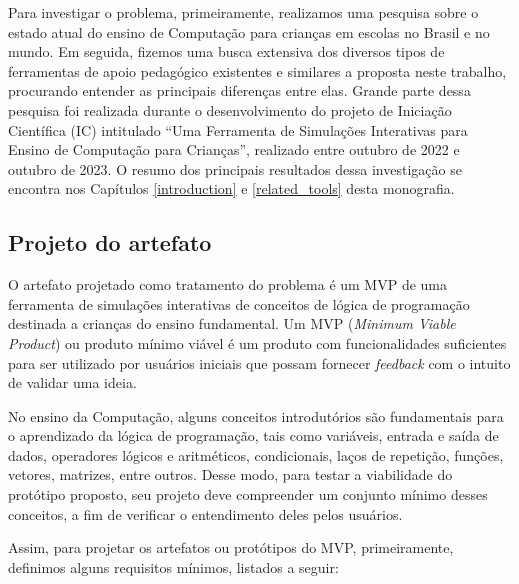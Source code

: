 Para investigar o problema, primeiramente, realizamos uma pesquisa sobre o estado atual do ensino de Computação para crianças em escolas no Brasil e no mundo. Em seguida, fizemos uma busca extensiva dos diversos tipos de ferramentas de apoio pedagógico existentes e similares a proposta neste trabalho, procurando entender as principais diferenças entre elas. Grande parte dessa pesquisa foi realizada durante o desenvolvimento do projeto de Iniciação Científica (IC) intitulado \enquote{Uma Ferramenta de Simulações Interativas para Ensino de Computação para Crianças}, realizado entre outubro de 2022 e outubro de 2023. O resumo dos principais resultados dessa investigação se encontra nos Capítulos \ref{introduction} e \ref{related_tools} desta monografia.

\subsection{Projeto do artefato} \label{design}

O artefato projetado como tratamento do problema é um MVP de uma ferramenta de simulações interativas de conceitos de lógica de programação destinada a crianças do ensino fundamental. Um MVP (\textit{Minimum Viable Product}) ou produto mínimo viável é um produto com funcionalidades suficientes para ser utilizado por usuários iniciais que possam fornecer \textit{feedback} com o intuito de validar uma ideia. 

No ensino da Computação, alguns conceitos introdutórios são fundamentais para o aprendizado da lógica de programação, tais como variáveis, entrada e saída de dados, operadores lógicos e aritméticos, condicionais, laços de repetição, funções, vetores, matrizes, entre outros. Desse modo, para testar a viabilidade do protótipo proposto, seu projeto deve compreender um conjunto mínimo desses conceitos, a fim de verificar o entendimento deles pelos usuários. 

Assim, para projetar os artefatos ou protótipos do MVP, primeiramente, definimos alguns requisitos mínimos, listados a seguir:

